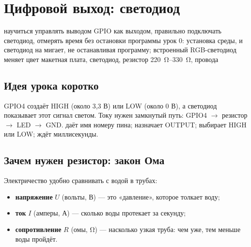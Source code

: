 \section{Цифровой выход: светодиод}\label{les:led}
\lessonintro
  {научиться управлять выводом GPIO как выходом, правильно подключать светодиод, отмерять время без остановки программы}
  {урок 0: установка среды,  и }
  {светодиод на  мигает, не останавливая программу; встроенный RGB-светодиод меняет цвет}
  {макетная плата, светодиод, резистор \SIrange{220}{330}{\ohm}, провода}

\subsection{Идея урока коротко}

GPIO4 создаёт HIGH (около 3,3 В) или LOW (около 0 В), а светодиод показывает этот сигнал светом.
Току нужен замкнутый путь: GPIO4 $\rightarrow$ резистор $\rightarrow$ LED $\rightarrow$ GND.
 даёт имя номеру пина;  назначает OUTPUT;  выбирает
HIGH или LOW;  ждёт миллисекунды.

\subsection{Зачем нужен резистор: закон Ома}

Электричество удобно сравнивать с водой в трубах:
\begin{itemize}
  \item \textbf{напряжение} $U$ (вольты, В) --- это «давление», которое толкает воду;
  \item \textbf{ток} $I$ (амперы, А) --- сколько воды протекает за секунду;
  \item \textbf{сопротивление} $R$ (омы, \si{\ohm}) --- насколько узкая труба: чем уже, тем меньше воды пройдёт.
\end{itemize}

